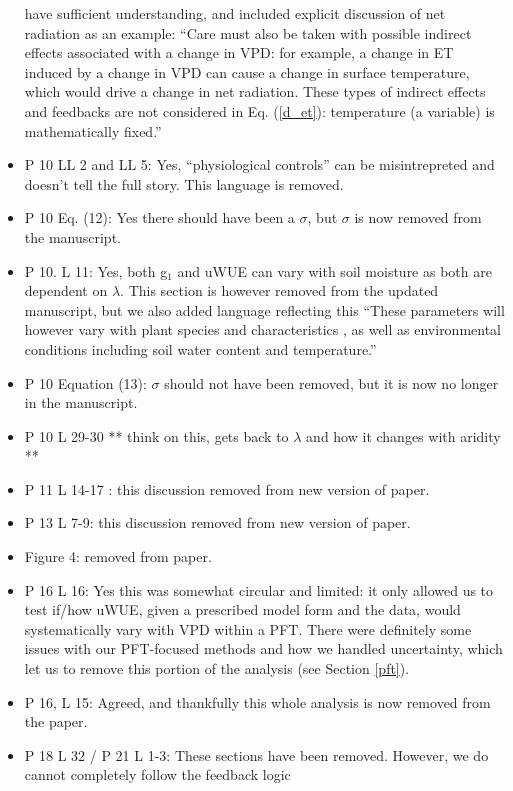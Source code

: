 \documentclass[12pt]{article}
\begin{document}
\begin{itemize}
  have sufficient understanding, and included explicit discussion of
  net radiation as an example: ``Care must also be taken with possible
  indirect effects associated with a change in VPD: for example, a
  change in ET induced by a change in VPD can cause a change in
  surface temperature, which would drive a change in net
  radiation. These types of indirect effects and feedbacks are not
  considered in Eq. (\ref{d_et}): temperature (a variable) is
  mathematically fixed.''
\item P 10 LL 2 and LL 5: Yes, ``physiological controls'' can be
  misintrepreted and doesn't tell the full story. This language is
  removed.
\item P 10 Eq. (12): Yes there should have been a $\sigma$, but
  $\sigma$ is now removed from the manuscript.
\item P 10. L 11: Yes, both g$_1$ and uWUE can vary with soil moisture
  as both are dependent on $\lambda$. This section is however removed
  from the updated manuscript, but we also added language reflecting
  this ``These parameters will however vary with plant species and
  characteristics \citep[e.g. wood density, ][]{Lin_2015}, as well as
  environmental conditions including soil water content
  \citep{Manzoni2013} and temperature.''
\item P 10 Equation (13): $\sigma$ should not have been removed, but
  it is now no longer in the manuscript.
\item P 10 L 29-30 ** think on this, gets back to $\lambda$ and how it
  changes with aridity **
\item P 11 L 14-17 : this discussion removed from new version of
  paper.
\item P 13 L 7-9: this discussion removed from new version of paper.
\item Figure 4: removed from paper.
\item P 16 L 16: Yes this was somewhat circular and limited: it only
  allowed us to test if/how uWUE, given a prescribed model form
  and the data, would systematically vary with VPD within a PFT. There
  were definitely some issues with our PFT-focused methods and how we
  handled uncertainty, which let us to remove this portion of the
  analysis (see Section \ref{pft}).
\item P 16, L 15: Agreed, and thankfully this whole analysis is now
  removed from the paper.
\item P 18 L 32 / P 21 L 1-3: These sections have been
  removed. However, we do cannot completely follow the feedback logic

\end{itemize}
\end{document}
